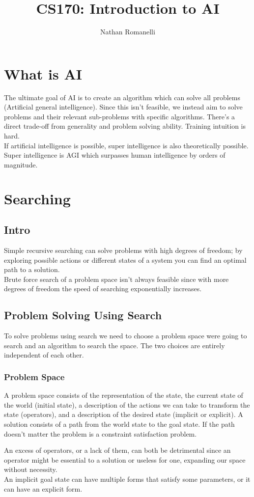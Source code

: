 \documentclass{chezarticle}
\title{CS170: Introduction to AI}
\author{Nathan Romanelli}
\begin{document}
\section{What is AI}
The ultimate goal of AI is to create an algorithm which can solve all problems (Artificial general intelligence). Since this isn't feasible, we instead aim to solve problems and their relevant sub-problems with specific algorithms. There's a direct trade-off from generality and problem solving ability. Training intuition is hard.
\\
If artificial intelligence is possible, super intelligence is also theoretically possible. Super intelligence is AGI which surpasses human intelligence by orders of magnitude. 

\section{Searching}
\subsection{Intro}
Simple recursive searching can solve problems with high degrees of freedom; by exploring possible actions or different states of a system you can find an optimal path to a solution.
\\
Brute force search of a problem space isn't always feasible since with more degrees of freedom the speed of searching exponentially increases.
\subsection{Problem Solving Using Search}
To solve problems using search we need to choose a problem space were going to search and an algorithm to search the space. The two choices are entirely independent of each other. 
\subsubsection{Problem Space}
\begin{definition}
A problem space consists of the representation of the state, the current state of the world (initial state), a description of the actions we can take to transform the state (operators), and a description of the desired state (implicit or explicit). A solution consists of a path from the world state to the goal state. If the path doesn't matter the problem is a constraint satisfaction problem.
\end{definition}
An excess of operators, or a lack of them, can both be detrimental since an operator might be essential to a solution or useless for one, expanding our space without necessity. \\
An implicit goal state can have multiple forms that satisfy some parameters, or it can have an explicit form.
\end{document}
